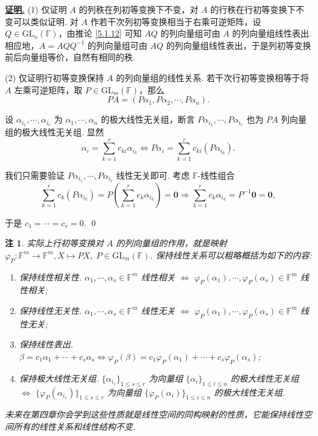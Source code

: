 \documentclass[10pt,openany]{article}
\theoremstyle{thmstyle} %
\theoremstyle{defstyle} %
\theoremstyle{prostyle} %
\theoremstyle{exastyle}
\theoremstyle{remstyle}
\newtheorem{remark}[theorem]{注}
\renewenvironment{proof}[1][证明]{\par\underline{\textbf{#1.}} \;\fangsong}{\qed\par}
\newcommand{\F}{\mathbb{F}}
\newcommand{\gfn}{\text{GL}_n(\mathbb{F})}
\newcommand{\gfm}{\text{GL}_m(\mathbb{F})}
\begin{document}
\begin{proof}
	(1) 仅证明 \( A \) 的列秩在列初等变换下不变，对 \( A \) 的行秩在行初等变换下不变可以类似证明. 对 \( A \) 作若干次列初等变换相当于右乘可逆矩阵，设 \( Q \in \gfn \)，由推论 \ref{5.1.12} 可知 \( AQ \) 的列向量组可由 \( A \) 的列向量组线性表出. 相应地，\( A=AQQ^{-1} \) 的列向量组可由 \( AQ \) 的列向量组线性表出，于是列初等变换前后向量组等价，自然有相同的秩.
	
	(2) 仅证明行初等变换保持 \( A \) 的列向量组的线性关系. 若干次行初等变换相等于将 \( A \) 左乘可逆矩阵，取 \( P \in \gfm \)，那么
	\[ PA=(P\alpha_1,P\alpha_2,\cdots,P\alpha_n). \]
	
	设 \( \alpha_{i_1},\cdots,\alpha_{i_r} \) 为 \( \alpha_1,\cdots,\alpha_n \) 的极大线性无关组，断言 \( P\alpha_{i_1},\cdots,P\alpha_{i_r} \) 也为 \( PA \) 列向量组的极大线性无关组. 显然
	\[ \alpha_i=\sum_{k=1}^{r} c_{ki}\alpha_{i_k} \Leftrightarrow P\alpha_i= \sum_{k=1}^{r} c_{ki}(P\alpha_{i_k}). \]
	
	我们只需要验证 \( P\alpha_{i_1},\cdots,P\alpha_{i_r} \) 线性无关即可. 考虑 \( \F\)-线性组合
	\[ \sum_{k=1}^{r} c_k(P\alpha_{i_k})=P \left( \sum_{k=1}^{r} c_k\alpha_{i_k} \right)=\bm{0} \Rightarrow \sum_{k=1}^{r} c_k\alpha_{i_k}=P^{-1}\bm{0}=\bm{0}, \]
	
	于是 \( c_1=\cdots=c_r=0 \).
\end{proof}

\begin{remark} \label{5.2.26}
	实际上行初等变换对 \( A \) 的列向量组的作用，就是映射 \( \varphi_P: \F^m \to \F^m, X \mapsto PX, \; P \in \gfm \). 保持线性关系可以粗略概括为如下的内容:
	\begin{enumerate}[(1)]
		\item 保持线性相关性. \; \( \alpha_1,\cdots,\alpha_s \in \F^m \) 线性相关 \( \Leftrightarrow \) \( \varphi_P(\alpha_1), \cdots, \varphi_P(\alpha_s)  \in \F^m \) 线性相关;
		\item 保持线性无关性. \; \( \alpha_1,\cdots,\alpha_s \in \F^m \) 线性无关 \( \Leftrightarrow \) \( \varphi_P(\alpha_1), \cdots, \varphi_P(\alpha_s) \in \F^m \) 线性无关;
		\item 保持线性表出. \; \( \beta= c_1\alpha_1+\cdots+c_s\alpha_s \Leftrightarrow \varphi_P(\beta)=c_1\varphi_P(\alpha_1)+\cdots+c_s\varphi_P(\alpha_s) \);
		\item 保持极大线性无关组. \; \( \{\alpha_{i_s}\}_{1 \leq s \leq r} \) 为向量组 \( \{\alpha_i\}_{1 \leq i \leq n} \) 的极大线性无关组 \( \Leftrightarrow \) \( \{\varphi_P(\alpha_{i_s})\}_{1 \leq s \leq r} \) 为向量组 \( \{\varphi_P(\alpha_i)\}_{1 \leq i \leq n} \) 的极大线性无关组.
	\end{enumerate}
	
	未来在第四章你会学到这些性质就是线性空间的同构映射的性质，它能保持线性空间所有的线性关系和线性结构不变.
\end{remark}
\end{document}
